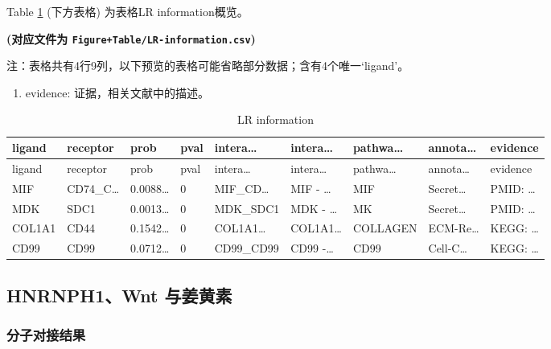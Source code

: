 \documentclass[
]{article}
\providecommand{\tightlist}{%
  \setlength{\itemsep}{0pt}\setlength{\parskip}{0pt}}
\begin{document}
Table \ref{tab:LR-information} (下方表格) 为表格LR information概览。

\textbf{(对应文件为 \texttt{Figure+Table/LR-information.csv})}

\begin{center}\begin{tcolorbox}[colback=gray!10, colframe=gray!50, width=0.9\linewidth, arc=1mm, boxrule=0.5pt]注：表格共有4行9列，以下预览的表格可能省略部分数据；含有4个唯一`ligand'。
\end{tcolorbox}
\end{center}
\begin{center}\begin{tcolorbox}[colback=gray!10, colframe=gray!50, width=0.9\linewidth, arc=1mm, boxrule=0.5pt]\begin{enumerate}\tightlist
\item evidence:  证据，相关文献中的描述。
\end{enumerate}\end{tcolorbox}
\end{center}

\begin{longtable}[]{@{}lllllllll@{}}
\caption{\label{tab:LR-information}LR information}\tabularnewline
\toprule
ligand & receptor & prob & pval & intera\ldots{} & intera\ldots{} & pathwa\ldots{} & annota\ldots{} & evidence\tabularnewline
\midrule
\endfirsthead
\toprule
ligand & receptor & prob & pval & intera\ldots{} & intera\ldots{} & pathwa\ldots{} & annota\ldots{} & evidence\tabularnewline
\midrule
\endhead
MIF & CD74\_C\ldots{} & 0.0088\ldots{} & 0 & MIF\_CD\ldots{} & MIF - \ldots{} & MIF & Secret\ldots{} & PMID: \ldots{}\tabularnewline
MDK & SDC1 & 0.0013\ldots{} & 0 & MDK\_SDC1 & MDK - \ldots{} & MK & Secret\ldots{} & PMID: \ldots{}\tabularnewline
COL1A1 & CD44 & 0.1542\ldots{} & 0 & COL1A1\ldots{} & COL1A1\ldots{} & COLLAGEN & ECM-Re\ldots{} & KEGG: \ldots{}\tabularnewline
CD99 & CD99 & 0.0712\ldots{} & 0 & CD99\_CD99 & CD99 -\ldots{} & CD99 & Cell-C\ldots{} & KEGG: \ldots{}\tabularnewline
\bottomrule
\end{longtable}

\hypertarget{hnrnph1wnt-ux4e0eux59dcux9ec4ux7d20-1}{%
\subsection{HNRNPH1、Wnt 与姜黄素}\label{hnrnph1wnt-ux4e0eux59dcux9ec4ux7d20-1}}

\hypertarget{ux5206ux5b50ux5bf9ux63a5ux7ed3ux679c}{%
\subsubsection{分子对接结果}\label{ux5206ux5b50ux5bf9ux63a5ux7ed3ux679c}}
\end{document}
